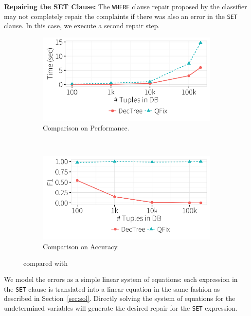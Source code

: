 \noindent
\textbf{Repairing the SET Clause:}
The \texttt{WHERE} clause repair proposed by the classifier may not completely repair 
the complaints if there was also an error in the \texttt{SET} clause. 
In this case, we execute a second repair step.
\begin{figure}[t]
\centering
  \begin{subfigure} [t]{.75\columnwidth}
  \includegraphics[width = \columnwidth]{figures/heuristictime}
  \caption{Comparison on Performance.}
  \label{f:heuristic_time} 
  \end{subfigure}\\

  \begin{subfigure} [t]{.75\columnwidth}
  \includegraphics[width = \columnwidth]{figures/heuristicacc}
  \caption{Comparison on Accuracy.}
  \label{f:heuristic_acc} 
  \end{subfigure}
 \caption{\dt compared with \sys}
 \label{f:heuristic}
\end{figure}


We model the errors as a simple linear system of equations: 
each expression in the \texttt{SET} clause is translated into a
linear equation in the same fashion as described in Section~\ref{sec:sol}.
Directly solving the system of equations for the undetermined variables 
will generate the desired repair for the \texttt{SET} expression.



